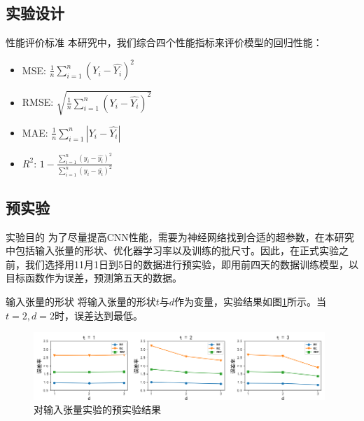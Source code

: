 \documentclass[10pt]{beamer}
\begin{document}
\subsection{实验设计}

\begin{frame}{性能评价标准}
    本研究中，我们综合四个性能指标来评价模型的回归性能：
     \begin{itemize}
         \item MSE: $\frac{1}{n} \sum_{i=1}^{n} \left( Y_i - \hat{Y_i} \right)^2$
         \item RMSE:  $ \sqrt{\frac{1}{n} \sum_{i=1}^{n} \left( Y_i - \hat{Y_i} \right)^2}$
         \item MAE: $\frac{1}{n} \sum_{i=1}^{n} \left| Y_i - \hat{Y_i} \right|$
         \item $R^2$: $1 - \frac{\sum_{i=1}^{n} (y_i - \hat{y_i})^2}{\sum_{i=1}^{n} (y_i - \bar{y_i})^2}$
         
     \end{itemize}
\end{frame}

\subsection{预实验}
\begin{frame}{实验目的}
    为了尽量提高CNN性能，需要为神经网络找到合适的超参数，在本研究中包括\alert{输入张量的形状}、\alert{优化器学习率}以及训练的\alert{批尺寸}。因此，在正式实验之前，我们选择用11月1日到5日的数据进行预实验，即用前四天的数据训练模型，以目标函数作为误差，预测第五天的数据。
\end{frame}

\begin{frame}{输入张量的形状}
    将输入张量的形状$t$与$d$作为变量，实验结果如图\ref{fig.inputShape}所示。当\alert{$t=2, d=2$}时，误差达到最低。
    \begin{figure}
        \centering
        \includegraphics[width=11cm]{pic/combine.png}
        \caption{对输入张量实验的预实验结果}
        \label{fig.inputShape}
    \end{figure}
\end{frame}
\end{document}
